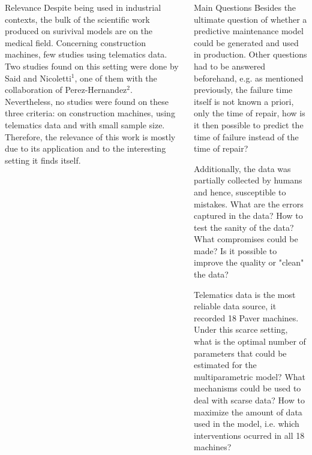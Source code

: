 \documentclass[t]{beamer}
\begin{document}
\begin{frame}[label={sec:orgc2b2963}]{}
\begin{columns}
\begin{column}{0.3\columnwidth}
\begin{block}{Relevance}
Despite being used in industrial contexts, the bulk of the scientific work produced on surivival models
are on the medical field. Concerning construction machines, few studies using telematics data. 
Two studies found on this setting were done by Said and Nicoletti\(^{1}\), 
one of them with the collaboration of Perez-Hernandez\(^{2}\). Nevertheless, no 
studies were found on these three criteria: 
on construction machines, using telematics data and with small sample size.
Therefore, the relevance of this work is mostly due to its application and to the 
interesting setting it finds itself.
\end{block}
\end{column}

\begin{column}{0.3\columnwidth}
\begin{block}{Main Questions}
Besides the ultimate question of whether a predictive maintenance model could be generated and used in production.
Other questions had to be answered beforehand, e.g. as mentioned previously, the failure time itself is not known a priori, 
only the time of repair, how is it then possible to predict the time of failure instead of the time of repair?

Additionally, the data was partially collected by humans and hence, susceptible to mistakes. What are the errors captured in the data? 
How to test the sanity of the data? What compromises could be made? Is it possible to improve the quality or "clean" the data?

Telematics data is the most reliable data source, it recorded 18 Paver machines. Under this scarce setting, what is the optimal number of parameters
that could be estimated for the multiparametric model? What mechanisms could be used to deal with scarse data? How to maximize the amount of
data used in the model, i.e. which interventions ocurred in all 18 machines?


\end{block}
\end{column}
\end{columns}
\end{frame}
\end{document}
